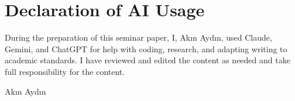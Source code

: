 \documentclass[12pt, a4paper]{article}
\begin{document}
\section*{Declaration of AI Usage}

During the preparation of this seminar paper, I, Ak\i n Ayd\i n, used Claude, Gemini, and ChatGPT for help with coding, research, and adapting writing to academic standards. I have reviewed and edited the content as needed and take full responsibility for the content.

Ak\i n Ayd\i n
\end{document}
